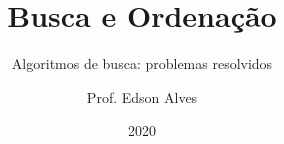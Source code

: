 \title{Busca e Ordenação}
\subtitle{Algoritmos de busca: problemas resolvidos}
\date{2020}
\author{Prof. Edson Alves}
